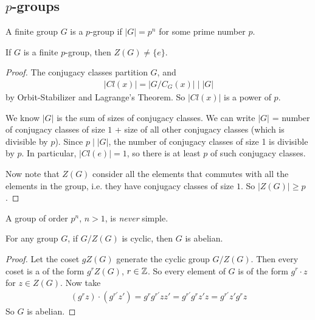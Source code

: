 \documentclass[a4paper]{article}
\begin{document}
\subsection{$p$-groups}
A finite group $G$ is a $p$-group if $|G| = p^n$ for some prime number $p$.

\begin{thm}
If $G$ is a finite $p$-group, then $Z(G) \neq \{e\}$.
\begin{proof}
The conjugacy classes partition $G$, and 
\begin{equation*}
\begin{aligned}
|Cl(x)| = |G/C_G(x)| \mid |G|
\end{aligned}
\end{equation*}
by Orbit-Stabilizer and Lagrange's Theorem. So $|Cl(x)|$ is a power of $p$.

We know $|G|$ is the sum of sizes of conjugacy classes. We can write $|G|$ = number of conjugacy classes of size $1$ + size of all other conjugacy classes (which is divisible by $p$). Since $p \mid |G|$, the number of conjugacy classes of size 1 is divisible by $p$. In particular, $|Cl(e)| = 1$, so there is at least $p$ of such conjugacy classes.

Now note that $Z(G)$ consider all the elements that commutes with all the elements in the group, i.e. they have conjugacy classes of size $1$. So $|Z(G)| \geq p$.
\end{proof}
\end{thm}

\begin{coro}
A group of order $p^n$, $n > 1$, is \emph{never} simple.
\end{coro}

\begin{lemma}
For any group $G$, if $G/Z(G)$ is cyclic, then $G$ is abelian.
\begin{proof}
Let the coset $gZ(G)$ generate the cyclic group $G/Z(G)$. Then every coset is a of the form $g^r Z(G)$, $r \in \mathbb{Z}$. So every element of $G$ is of the form $g^r \cdot z$ for $z \in Z(G)$. Now take
\begin{equation*}
\begin{aligned}
(g^rz)\cdot(g^{r'} z') = g^r g^{r'} z z' = g^{r'}g^r z'z = g^{r'} z' g^r z
\end{aligned}
\end{equation*}
So $G$ is abelian.
\end{proof}
\end{lemma}
\end{document}
